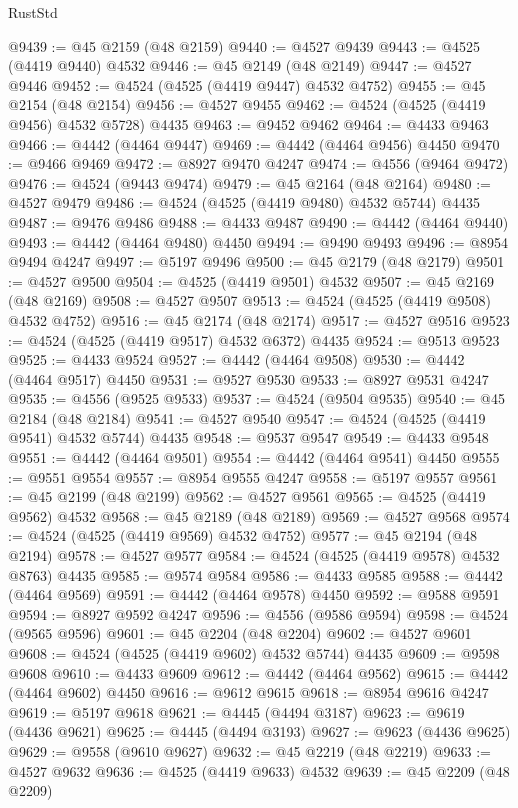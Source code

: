 \begin{lexlean}{RustStd}
\begin{coremodule}
@9439 := @45 @2159 (@48 @2159)
@9440 := @4527 @9439
@9443 := @4525 (@4419 @9440) @4532
@9446 := @45 @2149 (@48 @2149)
@9447 := @4527 @9446
@9452 := @4524 (@4525 (@4419 @9447) @4532 @4752)
@9455 := @45 @2154 (@48 @2154)
@9456 := @4527 @9455
@9462 := @4524 (@4525 (@4419 @9456) @4532 @5728) @4435
@9463 := @9452 @9462
@9464 := @4433 @9463
@9466 := @4442 (@4464 @9447)
@9469 := @4442 (@4464 @9456) @4450
@9470 := @9466 @9469
@9472 := @8927 @9470 @4247
@9474 := @4556 (@9464 @9472)
@9476 := @4524 (@9443 @9474)
@9479 := @45 @2164 (@48 @2164)
@9480 := @4527 @9479
@9486 := @4524 (@4525 (@4419 @9480) @4532 @5744) @4435
@9487 := @9476 @9486
@9488 := @4433 @9487
@9490 := @4442 (@4464 @9440)
@9493 := @4442 (@4464 @9480) @4450
@9494 := @9490 @9493
@9496 := @8954 @9494 @4247
@9497 := @5197 @9496
@9500 := @45 @2179 (@48 @2179)
@9501 := @4527 @9500
@9504 := @4525 (@4419 @9501) @4532
@9507 := @45 @2169 (@48 @2169)
@9508 := @4527 @9507
@9513 := @4524 (@4525 (@4419 @9508) @4532 @4752)
@9516 := @45 @2174 (@48 @2174)
@9517 := @4527 @9516
@9523 := @4524 (@4525 (@4419 @9517) @4532 @6372) @4435
@9524 := @9513 @9523
@9525 := @4433 @9524
@9527 := @4442 (@4464 @9508)
@9530 := @4442 (@4464 @9517) @4450
@9531 := @9527 @9530
@9533 := @8927 @9531 @4247
@9535 := @4556 (@9525 @9533)
@9537 := @4524 (@9504 @9535)
@9540 := @45 @2184 (@48 @2184)
@9541 := @4527 @9540
@9547 := @4524 (@4525 (@4419 @9541) @4532 @5744) @4435
@9548 := @9537 @9547
@9549 := @4433 @9548
@9551 := @4442 (@4464 @9501)
@9554 := @4442 (@4464 @9541) @4450
@9555 := @9551 @9554
@9557 := @8954 @9555 @4247
@9558 := @5197 @9557
@9561 := @45 @2199 (@48 @2199)
@9562 := @4527 @9561
@9565 := @4525 (@4419 @9562) @4532
@9568 := @45 @2189 (@48 @2189)
@9569 := @4527 @9568
@9574 := @4524 (@4525 (@4419 @9569) @4532 @4752)
@9577 := @45 @2194 (@48 @2194)
@9578 := @4527 @9577
@9584 := @4524 (@4525 (@4419 @9578) @4532 @8763) @4435
@9585 := @9574 @9584
@9586 := @4433 @9585
@9588 := @4442 (@4464 @9569)
@9591 := @4442 (@4464 @9578) @4450
@9592 := @9588 @9591
@9594 := @8927 @9592 @4247
@9596 := @4556 (@9586 @9594)
@9598 := @4524 (@9565 @9596)
@9601 := @45 @2204 (@48 @2204)
@9602 := @4527 @9601
@9608 := @4524 (@4525 (@4419 @9602) @4532 @5744) @4435
@9609 := @9598 @9608
@9610 := @4433 @9609
@9612 := @4442 (@4464 @9562)
@9615 := @4442 (@4464 @9602) @4450
@9616 := @9612 @9615
@9618 := @8954 @9616 @4247
@9619 := @5197 @9618
@9621 := @4445 (@4494 @3187)
@9623 := @9619 (@4436 @9621)
@9625 := @4445 (@4494 @3193)
@9627 := @9623 (@4436 @9625)
@9629 := @9558 (@9610 @9627)
@9632 := @45 @2219 (@48 @2219)
@9633 := @4527 @9632
@9636 := @4525 (@4419 @9633) @4532
@9639 := @45 @2209 (@48 @2209)

\end{coremodule}
\end{lexlean}
